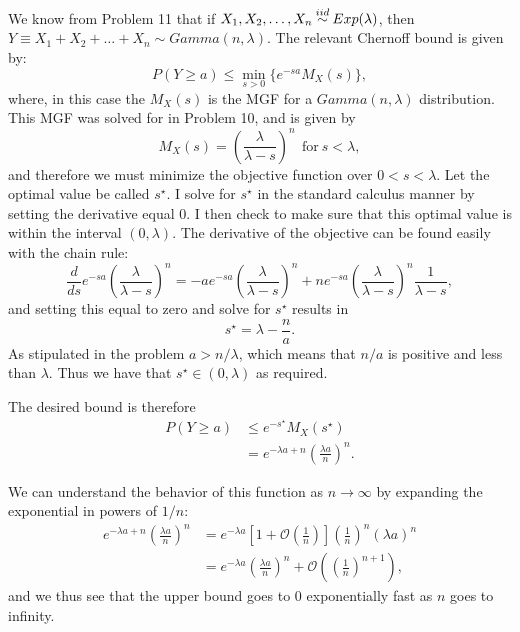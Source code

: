 \begin{problem}{23}
We know from Problem 11 that if $X_1, X_2, \ldots, X_n\distas{iid} Exp(\lambda)$, then $Y\equiv X_1+X_2+\ldots+X_n\sim Gamma(n, \lambda)$.  The relevant Chernoff bound is given by:
\begin{equation*}
P(Y \ge a) \le \min_{s>0} \{ e^{-sa}M_X(s) \},
\end{equation*}
where, in this case the $M_X(s)$ is the MGF for a $Gamma(n, \lambda)$ distribution.  This MGF was solved for in Problem 10, and is given by
\begin{equation*}
M_X(s) = \left(\frac{\lambda}{\lambda-s}\right)^n~~\mathrm{for}~s<\lambda,
\end{equation*}
and therefore we must minimize the objective function over $0<s<\lambda$.  Let the optimal value be called $s^\star$.  I solve for $s^\star$ in the standard calculus manner by setting the derivative equal 0.  I then check to make sure that this optimal value is within the interval $(0, \lambda)$.  The derivative of the objective can be found easily with the chain rule:
\begin{equation*}
\frac{d}{ds} e^{-sa} \left(\frac{\lambda}{\lambda-s}\right)^n = -a e^{-sa} \left(\frac{\lambda}{\lambda-s}\right)^n+ne^{-sa}\left(\frac{\lambda}{\lambda-s}\right)^n\frac{1}{\lambda-s},
\end{equation*}
and setting this equal to zero and solve for $s^\star$ results in
\begin{equation*}
s^\star = \lambda - \frac{n}{a}.
\end{equation*}
As stipulated in the problem $a>n/\lambda$, which means that $n/a$ is positive and less than $\lambda$.  Thus we have that $s^\star \in (0, \lambda)$ as required.

The desired bound is therefore
\begin{align*}
P(Y\ge a) & \le e^{-s^{\star}}M_X(s^\star) \\
& = e^{-\lambda a +n}\left(\frac{\lambda a}{n} \right)^n.
\end{align*}

We can understand the behavior of this function as $n \rightarrow \infty$ by expanding the exponential in powers of $1/n$:
\begin{align*}
e^{-\lambda a +n}\left(\frac{\lambda a}{n} \right)^n &= e^{-\lambda a} \left[1 +\mathcal{O}\left(\frac{1}{n}\right) \right]\left(\frac{1}{n} \right)^n(\lambda a )^n \\
& = e^{-\lambda a} \left(\frac{\lambda a }{n} \right)^n+\mathcal{O}\left (\left(\frac{1}{n}\right)^{n+1} \right),
\end{align*}
and we thus see that the upper bound goes to 0 exponentially fast as $n$ goes to infinity.


\end{problem}

